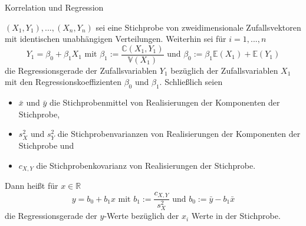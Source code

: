 \documentclass[
  8pt,
  ignorenonframetext,
]{beamer}
\begin{document}
\begin{frame}{Korrelation und Regression}
\protect\hypertarget{korrelation-und-regression-5}{}
\footnotesize
\begin{definition}[Stichprobenregressionsgerade]
\justifying
$(X_1,Y_1), ..., (X_n,Y_n)$ sei eine Stichprobe von zweidimensionale Zufallsvektoren
mit identischen unabhängigen Verteilungen. Weiterhin sei für $i = 1,...,n$
\begin{equation}
Y_1 = \beta_0 + \beta_1 X_1
\mbox{ mit }
\beta_1 := \frac{\mathbb{C}(X_1,Y_1)}{\mathbb{V}(X_1)}
\mbox{ und }
\beta_0 := \beta_1\mathbb{E}(X_1) + \mathbb{E}(Y_1)
\end{equation}
die Regressionsgerade der Zufallsvariablen $Y_1$ bezüglich der Zufallsvariablen
$X_1$ mit den Regressionskoeffizienten  $\beta_0$ und $\beta_1$. Schließlich seien
\begin{itemize}
\item $\bar{x}$  und $\bar{y}$ die Stichprobenmittel von Realisierungen der Komponenten der Stichprobe,
\item $s_X^2$ und $s_Y^2$ die Stichprobenvarianzen von Realisierungen der Komponenten der Stichprobe und
\item $c_{X,Y}$ die Stichprobenkovarianz  von Realisierungen der Stichprobe.
\end{itemize}
Dann heißt für $x \in \mathbb{R}$
\begin{equation}
y = b_0 + b_1 x
\mbox{ mit }
b_1 := \frac{c_{X,Y}}{s_X^2}
\mbox{ und }
b_0 := \bar{y} - b_1\bar{x}
\end{equation}
die Regressionsgerade der $y$-Werte bezüglich der $x_i$ Werte in der Stichprobe.
\end{definition}
\end{frame}
\end{document}

